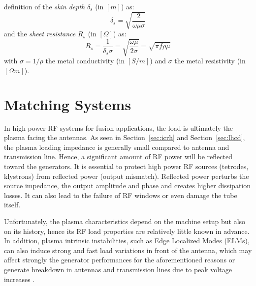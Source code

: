 definition of the \textit{skin depth} $\delta_s$ (in $[\si{m}]$) as:
\begin{equation}
\delta_s 
	=
	\sqrt{\frac{2}{\omega \mu \sigma}}
	\label{eq:skin_depth}
\end{equation}
and the \textit{sheet resistance} $R_s$ (in $[\si{\Omega}]$) as:
\begin{equation}
R_s 
	= 
	\frac{1}{\delta_s \sigma}
	=
	\sqrt{\frac{\omega\mu}{2\sigma}}
	=
	\sqrt{\pi f \rho \mu }
	\label{eq:sheet_resistance}
\end{equation}
with $\sigma=1/\rho$ the metal conductivity (in $[\si{S/m}]$) and $\sigma$ the metal resistivity (in $[\si{\Omega m}]$). 

\section{Matching Systems}\label{sec:matching_systems}
In high power RF systems for fusion applications, the load is ultimately the plasma facing the antennas. As seen in Section~\ref{sec:icrh} and Section~\ref{sec:lhcd}, the plasma loading impedance is generally small compared to antenna and transmission line. Hence, a significant amount of RF power will be reflected toward the generators. It is essential to protect high power RF sources (tetrodes, klystrons) from reflected power (output mismatch). Reflected power perturbs the source impedance, the output amplitude and phase and creates higher dissipation losses. It can also lead to the failure of RF windows  or even damage the tube itself. 

Unfortunately, the plasma characteristics depend on the machine setup but also on its history, hence its RF load properties are relatively little known in advance. In addition, plasma intrinsic instabilities, such as Edge Localized Modes (ELMs), can also induce strong and fast load variations in front of the antenna, which may affect strongly the generator performances for the aforementioned reasons or generate breakdown in antennas and transmission lines due to peak voltage increases . 

